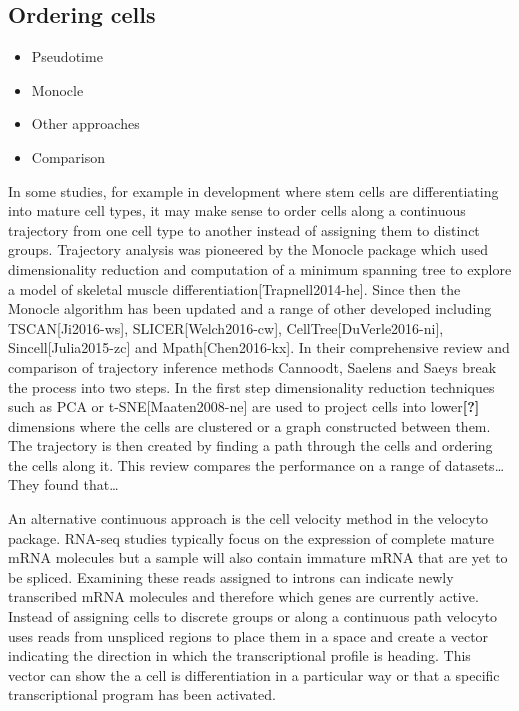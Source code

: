 \documentclass[11pt,a4paper,titlepage,twoside,openright]{style/unimelbthesis}
\theoremstyle{definition}
\theoremstyle{definition}
\theoremstyle{definition}
\theoremstyle{remark}
\begin{document}
\begin{mainmatter}
\hypertarget{ordering-cells}{%
\subsection{Ordering cells}\label{ordering-cells}}

\begin{itemize}
\tightlist
\item
  Pseudotime
\item
  Monocle
\item
  Other approaches
\item
  Comparison
\end{itemize}

In some studies, for example in development where stem cells are differentiating into mature cell types, it may make sense to order cells along a continuous trajectory from one cell type to another instead of assigning them to distinct groups. Trajectory analysis was pioneered by the Monocle package which used dimensionality reduction and computation of a minimum spanning tree to explore a model of skeletal muscle differentiation{[}Trapnell2014-he{]}. Since then the Monocle algorithm has been updated and a range of other developed including TSCAN{[}Ji2016-ws{]}, SLICER{[}Welch2016-cw{]}, CellTree{[}DuVerle2016-ni{]}, Sincell{[}Julia2015-zc{]} and Mpath{[}Chen2016-kx{]}. In their comprehensive review and comparison of trajectory inference methods Cannoodt, Saelens and Saeys break the process into two steps. In the first step dimensionality reduction techniques such as PCA or t-SNE{[}Maaten2008-ne{]} are used to project cells into lower\textbf{{[}?{]}} dimensions where the cells are clustered or a graph constructed between them. The trajectory is then created by finding a path through the cells and ordering the cells along it. This review compares the performance on a range of datasets\ldots{} They found that\ldots{}

An alternative continuous approach is the cell velocity method in the velocyto package. RNA-seq studies typically focus on the expression of complete mature mRNA molecules but a sample will also contain immature mRNA that are yet to be spliced. Examining these reads assigned to introns can indicate newly transcribed mRNA molecules and therefore which genes are currently active. Instead of assigning cells to discrete groups or along a continuous path velocyto uses reads from unspliced regions to place them in a space and create a vector indicating the direction in which the transcriptional profile is heading. This vector can show the a cell is differentiation in a particular way or that a specific transcriptional program has been activated.


\end{mainmatter}
\end{document}
